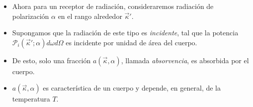 \documentclass[aspectratio=1610]{beamer}
\newcommand{\kv}{\Vec{\kappa}}
\begin{document}
\begin{frame}
	\begin{itemize}
		\item Ahora para un receptor de radiación, consideraremos radiación de polarización $\alpha$ en el rango alrededor $\kv'$.\pause
		\item Supongamos que la radiación de este tipo es \emph{incidente}, tal que la potencia $\mathcal{P}_i(\kv';\alpha)d\omega d\Omega$ es incidente por unidad de área del cuerpo.\pause
		\item De esto, solo una fracción $a(\kv,\alpha)$, llamada \emph{absorvencia}, es absorbida por el cuerpo.\pause
		\item $a(\kv,\alpha)$ es característica de un cuerpo y depende, en general, de la temperatura $T$.\pause
	\end{itemize}
	\begin{figure}
		\centering
		
		
		
		\begin{tikzpicture}[x=0.75pt,y=0.75pt,yscale=-1,xscale=1]
			

\end{tikzpicture}
\end{figure}
\end{frame}
\end{document}
